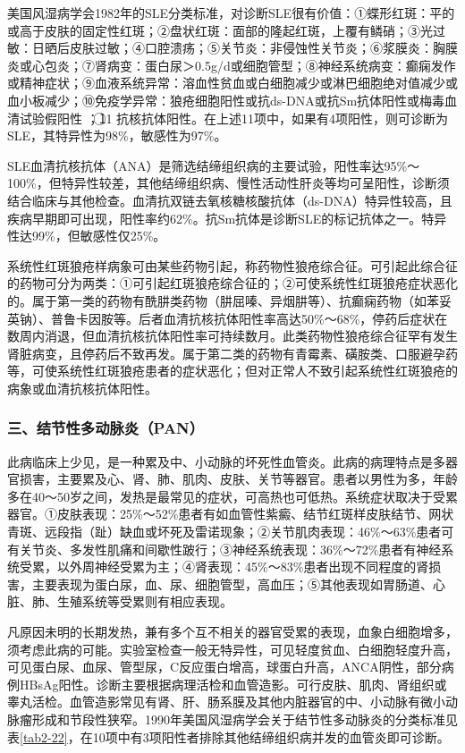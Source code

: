 美国风湿病学会1982年的SLE分类标准，对诊断SLE很有价值：①蝶形红斑：平的或高于皮肤的固定性红斑；②盘状红斑：面部的隆起红斑，上覆有鳞硝；③光过敏：日晒后皮肤过敏；④口腔溃疡；⑤关节炎：非侵蚀性关节炎；⑥浆膜炎：胸膜炎或心包炎；⑦肾病变：蛋白尿＞0.5g/d或细胞管型；⑧神经系统病变：癫痫发作或精神症状；⑨血液系统异常：溶血性贫血或白细胞减少或淋巴细胞绝对值减少或血小板减少；⑩免疫学异常：狼疮细胞阳性或抗ds-DNA或抗Sm抗体阳性或梅毒血清试验假阳性
；\textcircled{11}
抗核抗体阳性。在上述11项中，如果有4项阳性，则可诊断为SLE，其特异性为98\%，敏感性为97\%。

SLE血清抗核抗体（ANA）是筛选结缔组织病的主要试验，阳性率达95\%～100\%，但特异性较差，其他结缔组织病、慢性活动性肝炎等均可呈阳性，诊断须结合临床与其他检查。血清抗双链去氧核糖核酸抗体（ds-DNA）特异性较高，且疾病早期即可出现，阳性率约62\%。抗Sm抗体是诊断SLE的标记抗体之一。特异性达99\%，但敏感性仅25\%。

系统性红斑狼疮样病象可由某些药物引起，称药物性狼疮综合征。可引起此综合征的药物可分为两类：①可引起红斑狼疮综合征的；②可使系统性红斑狼疮症状恶化的。属于第一类的药物有酰肼类药物（肼屈嗪、异烟肼等）、抗癫痫药物（如苯妥英钠）、普鲁卡因胺等。后者血清抗核抗体阳性率高达50\%～68\%，停药后症状在数周内消退，但血清抗核抗体阳性率可持续数月。此类药物性狼疮综合征罕有发生肾脏病变，且停药后不致再发。属于第二类的药物有青霉素、磺胺类、口服避孕药等，可使系统性红斑狼疮患者的症状恶化；但对正常人不致引起系统性红斑狼疮的病象或血清抗核抗体阳性。

\subsubsection{三、结节性多动脉炎（PAN）}

此病临床上少见，是一种累及中、小动脉的坏死性血管炎。此病的病理特点是多器官损害，主要累及心、肾、肺、肌肉、皮肤、关节等器官。患者以男性为多，年龄多在40～50岁之间，发热是最常见的症状，可高热也可低热。系统症状取决于受累器官。①皮肤表现：25\%～52\%患者有如血管性紫癜、结节红斑样皮肤结节、网状青斑、远段指（趾）缺血或坏死及雷诺现象；②关节肌肉表现：46\%～63\%患者可有关节炎、多发性肌痛和间歇性跛行；③神经系统表现：36\%～72\%患者有神经系统受累，以外周神经受累为主；④肾表现：45\%～83\%患者出现不同程度的肾损害，主要表现为蛋白尿，血、尿、细胞管型，高血压；⑤其他表现如胃肠道、心脏、肺、生殖系统等受累则有相应表现。

凡原因未明的长期发热，兼有多个互不相关的器官受累的表现，血象白细胞增多，须考虑此病的可能。实验室检查一般无特异性，可见轻度贫血、白细胞轻度升高，可见蛋白尿、血尿、管型尿，C反应蛋白增高，球蛋白升高，ANCA阴性，部分病例HBsAg阳性。诊断主要根据病理活检和血管造影。可行皮肤、肌肉、肾组织或睾丸活检。血管造影常见有肾、肝、肠系膜及其他内脏器官的中、小动脉有微小动脉瘤形成和节段性狭窄。1990年美国风湿病学会关于结节性多动脉炎的分类标准见表\ref{tab2-22}，在10项中有3项阳性者排除其他结缔组织病并发的血管炎即可诊断。

